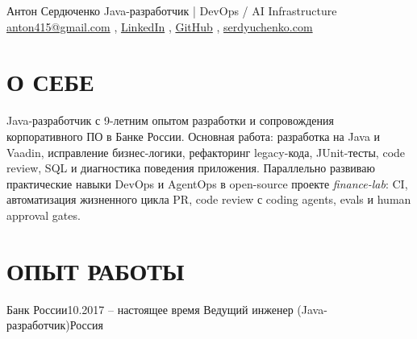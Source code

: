 \documentclass[a4paper,10pt]{article}
\begin{document}
\resumeHeader
  {Антон Сердюченко}
  {Java-разработчик | DevOps / AI Infrastructure}
  {\href{mailto:anton415@gmail.com}{anton415@gmail.com} \sep
   \href{https://www.linkedin.com/in/antonserdyuchenko}{LinkedIn} \sep
   \href{https://github.com/anton415}{GitHub} \sep
   \href{https://serdyuchenko.com}{serdyuchenko.com}}

\section{О СЕБЕ}
\small
Java-разработчик с 9-летним опытом разработки и сопровождения корпоративного ПО в Банке России. Основная работа: разработка на Java и Vaadin, исправление бизнес-логики, рефакторинг legacy-кода, JUnit-тесты, code review, SQL и диагностика поведения приложения. Параллельно развиваю практические навыки DevOps и AgentOps в open-source проекте \textit{finance-lab}: CI, автоматизация жизненного цикла PR, code review с coding agents, evals и human approval gates.

\section{ОПЫТ РАБОТЫ}
\resumeSubHeadingListStart
  \resumeSubheading
    {Банк России}{10.2017 -- настоящее время}
    {Ведущий инженер (Java-разработчик)}{Россия}
    \resumeItemListStart
    \resumeItemListEnd
\resumeSubHeadingListEnd
\end{document}
